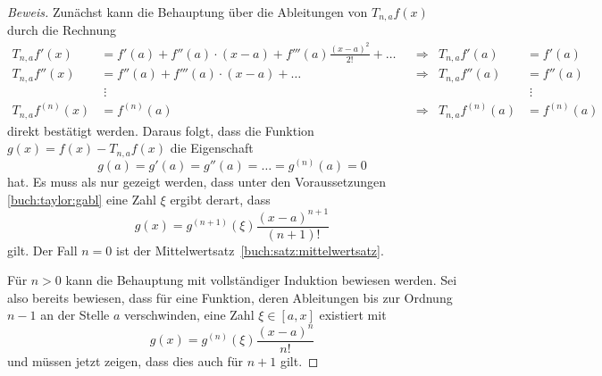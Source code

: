 \begin{proof}[Beweis]
Zunächst kann die Behauptung über die Ableitungen von $T_{n,a}f(x)$ durch
die Rechnung
\begin{align*}
T_{n,a}f'(x)
&=
f'(a) + f''(a) \cdot (x-a) + f'''(a)\frac{(x-a)^2}{2!} + \dots
&&\Rightarrow&
T_{n,a}f'(a) 
&=
f'(a)
\\
T_{n,a}f''(x)
&=
f''(a) + f'''(a) \cdot (x-a) + \dots
&&\Rightarrow&
T_{n,a}f''(a) 
&=
f''(a)
\\
&\;\vdots&&&&\;\vdots
\\
T_{n,a}f^{(n)}(x)
&=
f^{(n)}(a)
&&\Rightarrow&
T_{n,a}f^{(n)}(a)
&=
f^{(n)}(a)
\end{align*}
direkt bestätigt werden.
Daraus folgt, dass die Funktion $g(x) = f(x) - T_{n,a}f(x)$ die Eigenschaft
\begin{equation}
g(a) = g'(a) = g''(a) = \dots = g^{(n)}(a)=0
\label{buch:taylor:gabl}
\end{equation}
hat.
Es muss als nur gezeigt werden, dass unter den Voraussetzungen
\eqref{buch:taylor:gabl} eine Zahl $\xi$ ergibt derart, dass
\[
g(x) = g^{(n+1)}(\xi)\frac{(x-a)^{n+1}}{(n+1)!}
\]
gilt.
Der Fall $n=0$ ist der Mittelwertsatz~\ref{buch:satz:mittelwertsatz}.

Für $n>0$ kann die Behauptung mit vollständiger Induktion bewiesen werden.
Sei also bereits bewiesen, dass für eine Funktion, deren Ableitungen bis
zur Ordnung $n-1$ an der Stelle $a$ verschwinden, eine Zahl $\xi\in[a,x]$
existiert mit
\[
g(x) = g^{(n)}(\xi)\frac{(x-a)^n}{n!}
\]
und müssen jetzt zeigen, dass dies auch für $n+1$ gilt.


\end{proof}

